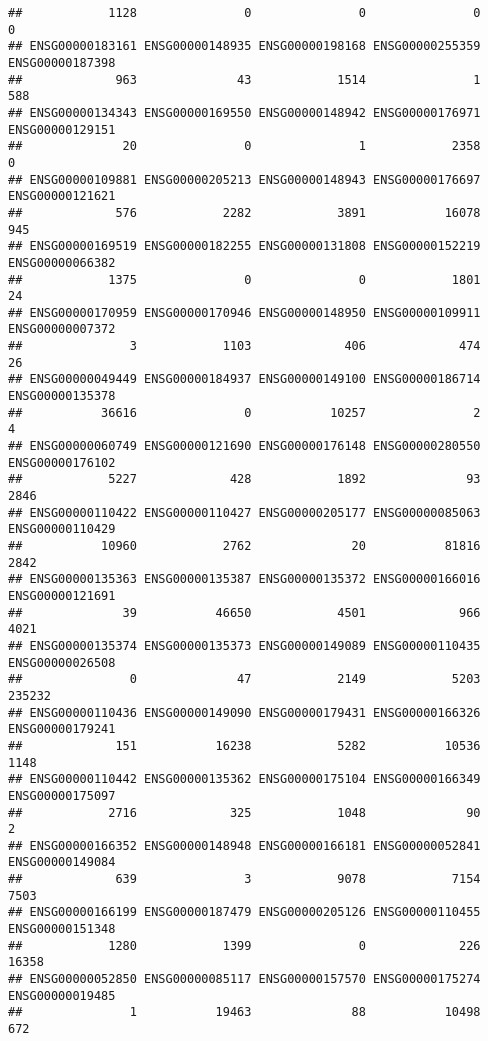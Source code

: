 \documentclass[
]{article}
\begin{document}
\begin{verbatim}
##            1128               0               0               0               0 
## ENSG00000183161 ENSG00000148935 ENSG00000198168 ENSG00000255359 ENSG00000187398 
##             963              43            1514               1             588 
## ENSG00000134343 ENSG00000169550 ENSG00000148942 ENSG00000176971 ENSG00000129151 
##              20               0               1            2358               0 
## ENSG00000109881 ENSG00000205213 ENSG00000148943 ENSG00000176697 ENSG00000121621 
##             576            2282            3891           16078             945 
## ENSG00000169519 ENSG00000182255 ENSG00000131808 ENSG00000152219 ENSG00000066382 
##            1375               0               0            1801              24 
## ENSG00000170959 ENSG00000170946 ENSG00000148950 ENSG00000109911 ENSG00000007372 
##               3            1103             406             474              26 
## ENSG00000049449 ENSG00000184937 ENSG00000149100 ENSG00000186714 ENSG00000135378 
##           36616               0           10257               2               4 
## ENSG00000060749 ENSG00000121690 ENSG00000176148 ENSG00000280550 ENSG00000176102 
##            5227             428            1892              93            2846 
## ENSG00000110422 ENSG00000110427 ENSG00000205177 ENSG00000085063 ENSG00000110429 
##           10960            2762              20           81816            2842 
## ENSG00000135363 ENSG00000135387 ENSG00000135372 ENSG00000166016 ENSG00000121691 
##              39           46650            4501             966            4021 
## ENSG00000135374 ENSG00000135373 ENSG00000149089 ENSG00000110435 ENSG00000026508 
##               0              47            2149            5203          235232 
## ENSG00000110436 ENSG00000149090 ENSG00000179431 ENSG00000166326 ENSG00000179241 
##             151           16238            5282           10536            1148 
## ENSG00000110442 ENSG00000135362 ENSG00000175104 ENSG00000166349 ENSG00000175097 
##            2716             325            1048              90               2 
## ENSG00000166352 ENSG00000148948 ENSG00000166181 ENSG00000052841 ENSG00000149084 
##             639               3            9078            7154            7503 
## ENSG00000166199 ENSG00000187479 ENSG00000205126 ENSG00000110455 ENSG00000151348 
##            1280            1399               0             226           16358 
## ENSG00000052850 ENSG00000085117 ENSG00000157570 ENSG00000175274 ENSG00000019485 
##               1           19463              88           10498             672 

\end{verbatim}
\end{document}
